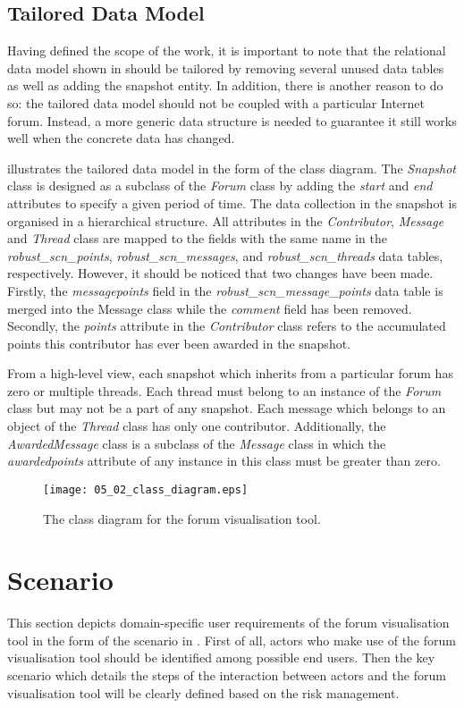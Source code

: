 \subsection{Tailored Data Model}
Having defined the scope of the work, it is important to note that the relational data model shown in  should be tailored by removing several unused data tables as well as adding the snapshot entity. In addition, there is another reason to do so: the tailored data model should not be coupled with a particular Internet forum. Instead, a more generic data structure is needed to guarantee it still works well when the concrete data has changed.

 illustrates the tailored data model in the form of the class diagram. The \emph{Snapshot} class is designed as a subclass of the \emph{Forum} class by adding the \emph{start} and \emph{end} attributes to specify a given period of time. The data collection in the snapshot is organised in a hierarchical structure. All attributes in the \emph{Contributor}, \emph{Message} and \emph{Thread} class are mapped to the fields with the same name in the \emph{robust\_scn\_points}, \emph{robust\_scn\_messages}, and \emph{robust\_scn\_threads} data tables, respectively. However, it should be noticed that two changes have been made. Firstly, the \emph{messagepoints} field in the \emph{robust\_scn\_message\_points} data table is merged into the Message class while the \emph{comment} field has been removed. Secondly, the \emph{points} attribute in the \emph{Contributor} class refers to the accumulated points this contributor has ever been awarded in the snapshot.

From a high-level view, each snapshot which inherits from a particular forum has zero or multiple threads. Each thread must belong to an instance of the \emph{Forum} class but may not be a part of any snapshot. Each message which belongs to an object of the \emph{Thread} class has only one contributor. Additionally, the \emph{AwardedMessage} class is a subclass of the \emph{Message} class in which the \emph{awardedpoints} attribute of any instance in this class must be greater than zero.

\begin{figure}[!htb]
  \centering
  \texttt{[image: 05\_02\_class\_diagram.eps]}
  \caption{The class diagram for the forum visualisation tool.}
  \label{Figure:05_02}
\end{figure}

\section{Scenario} \label{sec:scenario}
This section depicts domain-specific user requirements of the forum visualisation tool in the form of the scenario  in . First of all, actors who make use of the forum visualisation tool should be identified among possible end users. Then the key scenario which details the steps of the interaction between actors and the forum visualisation tool will be clearly defined based on the risk management.


